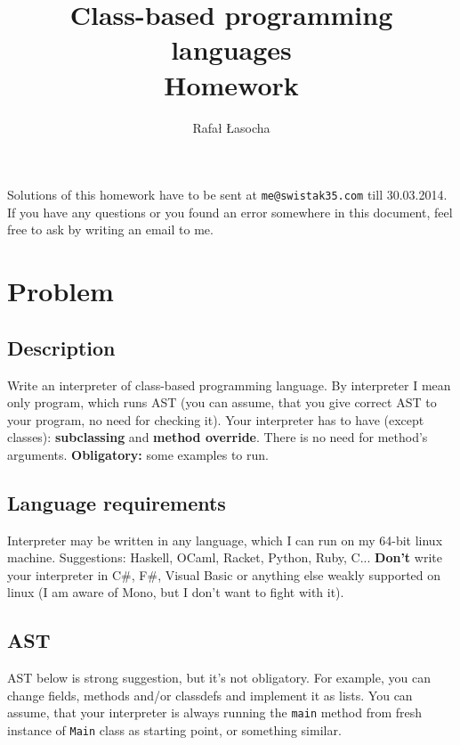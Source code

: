 \documentclass[a4paper,11pt]{article}
\title{
  \textbf{Class-based programming languages}\\
  {\Large Homework}
}
\author{Rafał Łasocha}
\begin{document}
\maketitle

Solutions of this homework have to be sent at \texttt{me@swistak35.com} till 30.03.2014. If you have any questions or you found an error somewhere in this document, feel free to ask by writing an email to me.

\section{Problem}
\subsection{Description}
Write an interpreter of class-based programming language.
By interpreter I mean only program, which runs AST (you can assume, that you give correct AST to your program, no need for checking it).
Your interpreter has to have (except classes): \textbf{subclassing} and \textbf{method override}.
There is no need for method's arguments.
\textbf{Obligatory:} some examples to run.

\subsection{Language requirements}
Interpreter may be written in any language, which I can run on my 64-bit linux machine.
Suggestions: Haskell, OCaml, Racket, Python, Ruby, C...
\textbf{Don't} write your interpreter in C\#, F\#, Visual Basic or anything else weakly supported on linux
 (I am aware of Mono, but I don't want to fight with it).

\subsection{AST}
AST below is strong suggestion, but it's not obligatory. For example, you can change fields, methods and/or classdefs and implement it as lists.
You can assume, that your interpreter is always running the \texttt{main} method from fresh instance of \texttt{Main} class as starting point, or something similar.

\lstset{
  basicstyle=\scriptsize
}
 
\end{document}
